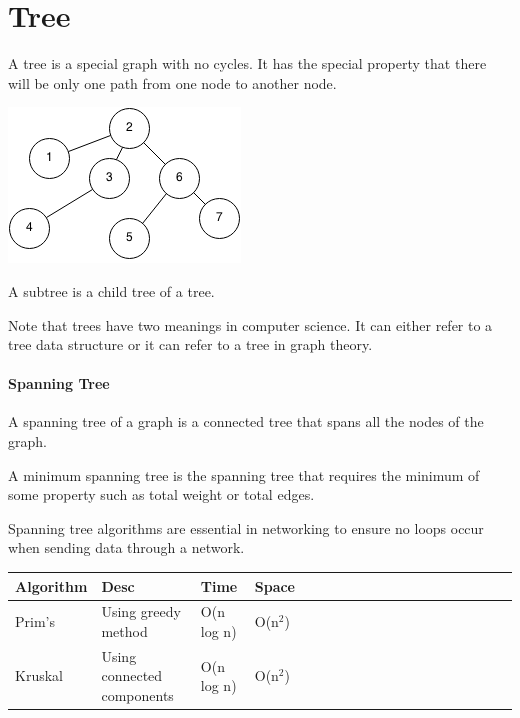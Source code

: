 \documentclass[11pt,oneside]{book}
\makeatletter
\def\maxwidth#1{\ifdim\Gin@nat@width>#1 #1\else\Gin@nat@width\fi}
\makeatother
\begin{document}
    \chapter{ Tree }
        



A tree is a special graph with no cycles. It has the special property that there will be only one path from one node to another node.

\vspace{5px}\includegraphics[width=\maxwidth{\textwidth}]{treegraph.png}

A subtree is a child tree of a tree.

Note that trees have two meanings in computer science. It can either refer to a tree data structure or it can refer to a tree in graph theory.


\subsubsection{Spanning Tree}



A spanning tree of a graph is a connected tree that spans all the nodes of the graph.

A minimum spanning tree is the spanning tree that requires the minimum of some property such as total weight or total edges.

Spanning tree algorithms are essential in networking to ensure no loops occur when sending data through a network.

\vspace{10px}\begin{tabulary}{0.4\linewidth}{|l|l|l|l|l|l|l|l|l|l|l|l|l|l|l|l|l|l|l}\hline


  Algorithm &
  Desc &
  Time &
  Space\\
\hline


  Prim's &
  Using greedy method &
  O(n log n) &
  O(n$^{2}$)\\

  Kruskal &
  Using connected components &
  O(n log n) &
  O(n$^{2}$)\\

\hline\end{tabulary}
\end{document}
